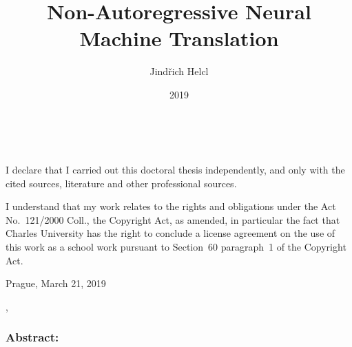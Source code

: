\documentclass[12pt,notitlepage,a4paper,openright]{report}
\title{Non-Autoregressive Neural Machine Translation}
\author{Jindřich Helcl}
\date{2019}
\begin{document}
%
%
%
\renewcommand{\thepage}{\roman{page}}
\maketitle

\pagestyle{plain}
\normalsize %
\setcounter{page}{2} %

\cleardoublepage{}
\ \vspace{10mm}

\noindent \it

\vspace{\fill}
\noindent \rm
I declare that I carried out this doctoral thesis independently,
  and only with the cited sources, literature and other professional sources.

I understand that my work relates to the rights and obligations
  under the Act No.~121/2000 Coll., the Copyright Act, as amended,
  in particular the fact that Charles University has the right
  to conclude a license agreement on the use of this work as a school work
  pursuant to Section~60 paragraph~1 of the Copyright Act.

\vspace{2cm}
\noindent Prague, March 21, 2019 \hspace{\fill}\theauthor\\ %


\cleardoublepage{} %
\pagestyle{plain}
{}
\begin{description}[leftmargin=7.5em,labelwidth=7em,labelindent=0em,labelsep=0.5em]
\item[Title:] \thetitle{}
\item[Author:] \theauthor{}
\item[Department:] \thedept{}
\item[Supervisor:] \thesupervisor{},\\ \thedept{}
\end{description}
\subsubsection{Abstract:}
\end{document}
